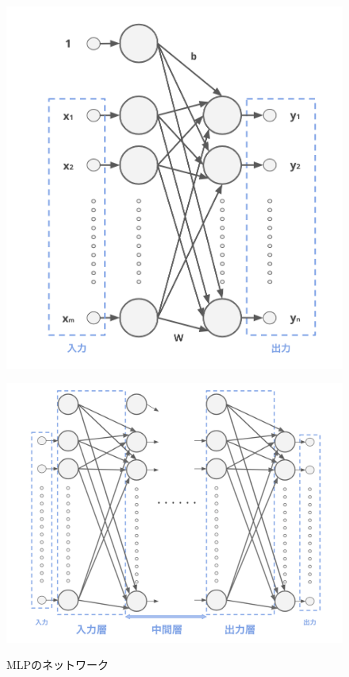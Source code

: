 \begin{figure}[b]
\centering
\begin{minipage}[b]{0.4\columnwidth}
\centering
\includegraphics[width=\columnwidth]{figure/mlp_net0.png}
\label{fig:MLP_net0}
\end{minipage}
\begin{minipage}[b]{0.5\columnwidth}
\centering
\includegraphics[width=\columnwidth]{figure/mlp_net1.png}
\label{fig:MLP_net1}
\end{minipage}
\caption{MLPのネットワーク}
\end{figure}

